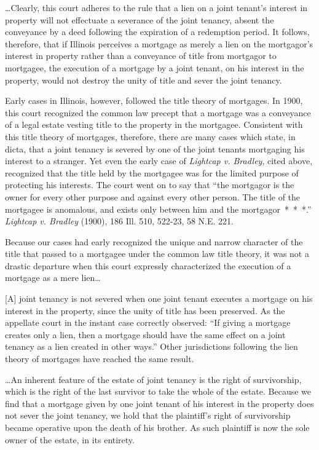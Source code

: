  \dots Clearly, this court adheres to the rule that a lien on a joint tenant's
interest in property will not effectuate a severance of the joint tenancy,
absent the conveyance by a deed following the expiration of a redemption
period. It follows, therefore, that if Illinois perceives a mortgage as merely
a lien on the mortgagor's interest in property rather than a conveyance of
title from mortgagor to mortgagee, the execution of a mortgage by a joint
tenant, on his interest in the property, would not destroy the unity of title
and sever the joint tenancy.

Early cases in Illinois, however, followed the title theory of mortgages. In
1900, this court recognized the common law precept that a mortgage was a
conveyance of a legal estate vesting title to the property in the mortgagee.
Consistent with this title theory of mortgages, therefore, there are many cases
which state, in dicta, that a joint tenancy is severed by one of the joint
tenants mortgaging his interest to a stranger. Yet even the early case of
\emph{Lightcap v. Bradley}, cited above, recognized that the title held by the
mortgagee was for the limited purpose of protecting his interests. The court
went on to say that ``the mortgagor is the owner for every other purpose and
against every other person. The title of the mortgagee is anomalous, and exists
only between him and the mortgagor~*~*~*.'' \emph{Lightcap v. Bradley} (1900),
186 Ill. 510, 522-23, 58 N.E. 221.

Because our cases had early recognized the unique and narrow character of the
title that passed to a mortgagee under the common law title theory, it was not
a drastic departure when this court expressly characterized the execution of a
mortgage as a mere lien\dots

[A] joint tenancy is not severed when one joint tenant executes a mortgage on
his interest in the property, since the unity of title has been preserved. As
the appellate court in the instant case correctly observed: ``If giving a
mortgage creates only a lien, then a mortgage should have the same effect on a
joint tenancy as a lien created in other ways.'' Other jurisdictions following
the lien theory of mortgages have reached the same result.

\dots An inherent feature of the estate of joint tenancy is the right of
survivorship, which is the right of the last survivor to take the whole of the
estate. Because we find that a mortgage given by one joint tenant of his
interest in the property does not sever the joint tenancy, we hold that the
plaintiff's right of survivorship became operative upon the death of his
brother. As such plaintiff is now the sole owner of the estate, in its
entirety.


